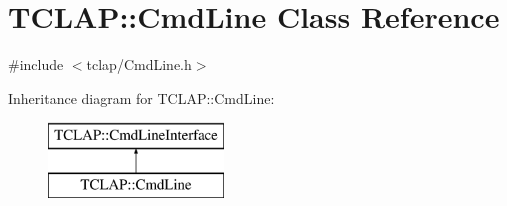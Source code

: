 \hypertarget{class_t_c_l_a_p_1_1_cmd_line}{}\section{T\+C\+L\+A\+P\+:\+:Cmd\+Line Class Reference}
\label{class_t_c_l_a_p_1_1_cmd_line}


{\ttfamily \#include $<$tclap/\+Cmd\+Line.\+h$>$}

Inheritance diagram for T\+C\+L\+A\+P\+:\+:Cmd\+Line\+:\begin{figure}[H]
\begin{center}
\leavevmode
\includegraphics[height=2.000000cm]{class_t_c_l_a_p_1_1_cmd_line}
\end{center}
\end{figure}
